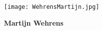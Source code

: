 
\begin{figure}
    \hfill
    \begin{minipage}[c]{0.25\textwidth}
        \texttt{[image: WehrensMartijn.jpg]}
        \caption*{\textbf{Martijn Wehrens}}
    \end{minipage}
\end{figure}

%
%
%
%
%
%
%
%
%
%

%
%
%
%    

